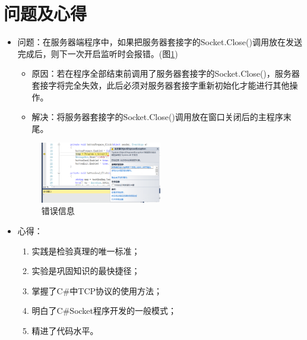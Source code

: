 \documentclass[a4paper]{ctexrep}
\begin{document}
\section{问题及心得}
	\begin{itemize}
		\item 问题：在服务器端程序中，如果把服务器套接字的Socket.Close()调用放在发送完成后，则下一次开启监听时会报错。(图\ref{error})
		\begin{itemize}
			\item 原因：若在程序全部结束前调用了服务器套接字的Socket.Close()，服务器套接字将完全失效，此后必须对服务器套接字重新初始化才能进行其他操作。
			\item 解决：将服务器套接字的Socket.Close()调用放在窗口关闭后的主程序末尾。
		\end{itemize}
		\begin{figure}[htbp]
			\centering
			\includegraphics [width=0.5\textwidth]{figure//error.png}
			\caption{错误信息}\label{error}
		\end{figure}
		\item 心得：\begin{enumerate}
			\item 实践是检验真理的唯一标准；
			\item 实验是巩固知识的最快捷径；
			\item 掌握了C\#中TCP协议的使用方法；
			\item 明白了C\#Socket程序开发的一般模式；
			\item 精进了代码水平。
		\end{enumerate}
	\end{itemize}
\newpage
{}
\renewcommand{\thechapter}{附录\Alph{chapter}.} 
\end{document}
